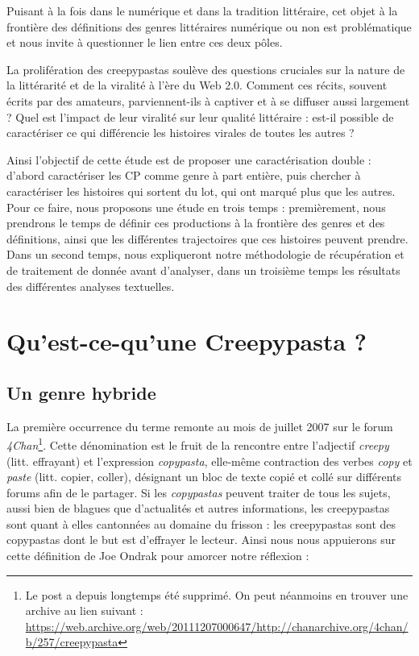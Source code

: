 \documentclass[12pt,a4paper,oneside,titlepage]{book} %
\begin{document}
Puisant à la fois dans le numérique et dans la tradition littéraire, cet objet à la frontière des définitions des genres littéraires numérique ou non est problématique et nous invite à questionner le lien entre ces deux pôles.

La prolifération des creepypastas soulève des questions cruciales sur la nature de la littérarité et de la viralité à l'ère du Web 2.0. Comment ces récits, souvent écrits par des amateurs, parviennent-ils à captiver et à se diffuser aussi largement ? Quel est l'impact de leur viralité sur leur qualité littéraire : est-il possible de caractériser ce qui différencie les histoires virales de toutes les autres ? 

Ainsi l'objectif de cette étude est de proposer une caractérisation double : d'abord caractériser les CP comme genre à part entière, puis chercher à caractériser les histoires qui sortent du lot, qui ont marqué plus que les autres. 
Pour ce faire, nous proposons une étude en trois temps  : premièrement, nous prendrons le temps de définir ces productions à la frontière des genres et des définitions, ainsi que les différentes trajectoires que ces histoires peuvent prendre. Dans un second temps, nous expliqueront notre méthodologie de récupération et de traitement de donnée avant d'analyser, dans un troisième temps les résultats des différentes analyses textuelles.

	
	
\mainmatter
\part{Qu'est-ce-qu'une Creepypasta ?}

\chapter{Un genre hybride}
	\par
	La première occurrence du terme remonte au mois de juillet 2007 sur le forum \emph{4Chan}\footnote{Le post a depuis longtemps été supprimé. On peut néanmoins en trouver une archive au lien suivant : \url{https://web.archive.org/web/20111207000647/http://chanarchive.org/4chan/b/257/creepypasta}}. Cette dénomination est le fruit de la rencontre entre l'adjectif \emph{creepy} (litt. effrayant) et l'expression \emph{copypasta}, elle-même contraction des verbes \emph{copy} et \emph{paste} (litt. copier, coller), désignant un bloc de texte copié et collé sur différents forums afin de le partager. Si les \emph{copypastas} peuvent traiter de tous les sujets, aussi bien de blagues que d'actualités et autres informations, les creepypastas sont quant à elles cantonnées au domaine du frisson : les creepypastas sont des copypastas dont le but est d'effrayer le lecteur. Ainsi nous nous appuierons sur cette définition de Joe Ondrak pour amorcer notre réflexion : 
	
\end{document}
